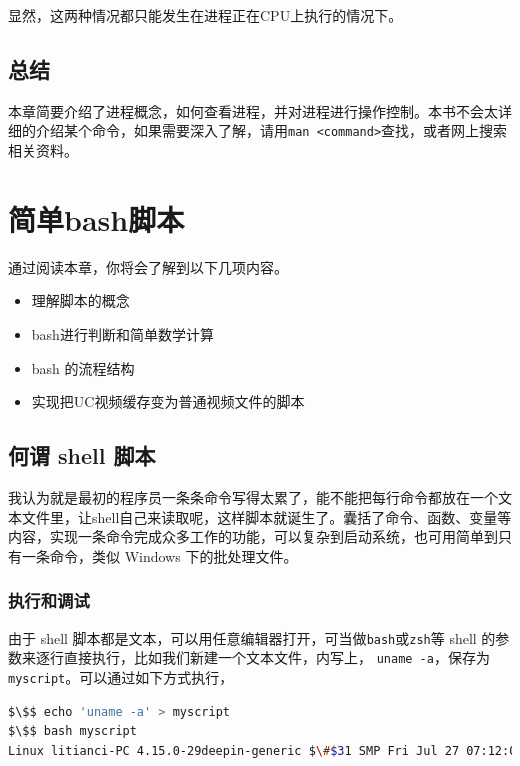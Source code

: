 \documentclass[doctor,openright,twoside]{sjtuthesis}
\providecommand{\tightlist}{%
    \setlength{\itemsep}{0pt}\setlength{\parskip}{0pt}}
\newcommand{\passthrough}[1]{#1}
\theoremstyle{plain}
\theoremstyle{definition}
\theoremstyle{remark}
\theoremstyle{ocrenumbox}
\theoremstyle{plain}
\begin{document}
显然，这两种情况都只能发生在进程正在CPU上执行的情况下。

\hypertarget{-6}{%
\section{总结}\label{-6}}

本章简要介绍了进程概念，如何查看进程，并对进程进行操作控制。本书不会太详细的介绍某个命令，如果需要深入了解，请用\passthrough{\lstinline!man <command>!}查找，或者网上搜索相关资料。

\hypertarget{chap:simple-bash-scripts}{%
\chapter{简单bash脚本}\label{chap:simple-bash-scripts}}

通过阅读本章，你将会了解到以下几项内容。

\begin{itemize}
\tightlist
\item
  理解脚本的概念
\item
  bash进行判断和简单数学计算
\item
  bash 的流程结构
\item
  实现把UC视频缓存变为普通视频文件的脚本
\end{itemize}

\hypertarget{-shell-}{%
\section{何谓 shell 脚本}\label{-shell-}}

我认为就是最初的程序员一条条命令写得太累了，能不能把每行命令都放在一个文本文件里，让shell自己来读取呢，这样脚本就诞生了。囊括了命令、函数、变量等内容，实现一条命令完成众多工作的功能，可以复杂到启动系统，也可用简单到只有一条命令，类似
Windows 下的批处理文件。

\subsection{执行和调试}

由于 shell
脚本都是文本，可以用任意编辑器打开，可当做\passthrough{\lstinline!bash!}或\passthrough{\lstinline!zsh!}等
shell 的参数来逐行直接执行，比如我们新建一个文本文件，内写上，
\passthrough{\lstinline!uname -a!}，保存为\passthrough{\lstinline!myscript!}。可以通过如下方式执行，
\lstset{mathescape=true}

\begin{lstlisting}[language=bash]
$\$$ echo 'uname -a' > myscript
$\$$ bash myscript 
Linux litianci-PC 4.15.0-29deepin-generic $\#$31 SMP Fri Jul 27 07:12:08 UTC 2018 x86_64 GNU/Linux
\end{lstlisting}
\end{document}
